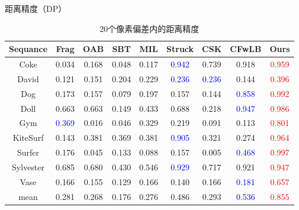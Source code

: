 \begin{frame}{距离精度（DP）}
\begin{table}[!t]
\centering
\renewcommand{\arraystretch}{1.3}
\captionsetup{belowskip=2pt,aboveskip=4pt}

\caption{20个像素偏差内的距离精度}
\begin{adjustbox}{max width=\textwidth}
    \begin{tabular}{|c|c|c|c|c|c|c|c|c|}
        \hline
        Sequance  & Frag  &  OAB  &  SBT  &  MIL  & Struck & CSK   & CFwLB   &  Ours \\ \hline
        
        Coke      & 0.034 & 0.168 & 0.048  & 0.117 & \textcolor{blue}{0.942} & 0.739 & 0.918   & \textcolor{red}{0.959}  \\ \hline
        David     & 0.121 & 0.151 & 0.204  & 0.229 & \textcolor{blue}{0.236} & \textcolor{blue}{0.236} & 0.144   & \textcolor{red}{0.396} \\ \hline
        Dog       & 0.173 & 0.157 & 0.079  & 0.197 & 0.157 & 0.144 & \textcolor{blue}{0.858}   & \textcolor{red}{0.992}  \\ \hline
        Doll      & 0.663 & 0.663 & 0.149  & 0.433 & 0.688 & 0.218 & \textcolor{blue}{0.947}& \textcolor{red}{ 0.986} \\ \hline
        Gym       & \textcolor{blue}{0.369} & 0.016 & 0.046  & 0.329 & 0.219 & 0.091 & 0.113   & \textcolor{red}{0.801}  \\ \hline
        KiteSurf  & 0.143 & 0.381 & 0.369  & 0.381 & \textcolor{blue}{0.905} & 0.321 & 0.274   & \textcolor{red}{0.964}  \\ \hline
        Surfer    & 0.176 & 0.045 & 0.133  & 0.088 & 0.157 & 0.005  & \textcolor{blue}{0.468}   & \textcolor{red}{0.997}  \\ \hline
    Sylvester     & 0.685 & 0.680 & 0.430  & 0.546 & \textcolor{blue}{0.929} & 0.717 & 0.921 & \textcolor{red}{0.947}\\ \hline
        Vase      & 0.166 & 0.155 & 0.129  & 0.166 & 0.140 & 0.166  & \textcolor{blue}{0.181}   & \textcolor{red}{0.657}  \\ \hline \hline

        mean      &0.281  & 0.268 & 0.176  & 0.276 & 0.486 & 0.293  & \textcolor{blue}{0.536}& \textcolor{red}{0.855} \\ \hline
\end{tabular}
\end{adjustbox}
\label{tab:CFwLB_precision}
\end{table}
\end{frame}

